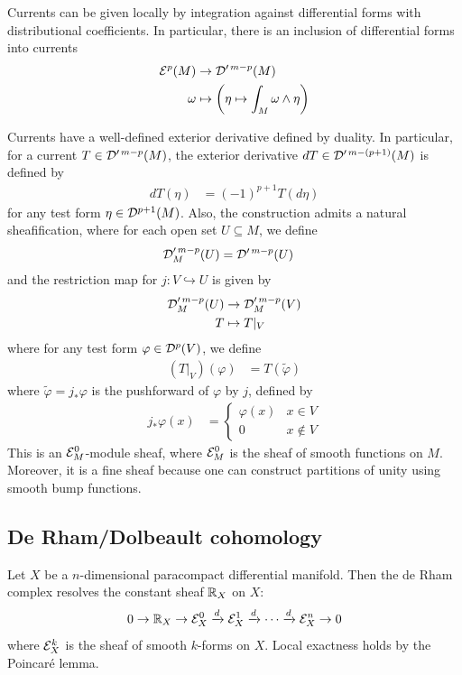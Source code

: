 \documentclass[12pt]{article}
\begin{document}
Currents can be given locally by integration against differential forms with distributional coefficients. In particular, there is an inclusion of differential forms into currents \begin{align*}
    {\mathcal{E}}^p(M) & \to {\mathcal{D}}'^{\,m-p}(M) \\
    \omega & \mapsto \left( \eta \mapsto \int_M \omega \wedge \eta \right)
\end{align*} 

Currents have a well-defined exterior derivative defined by duality. In particular, for a current $T \in {\mathcal{D}}'^{\,m-p}(M)$, the exterior derivative $dT \in {\mathcal{D}}'^{\,m-(p+1)}(M)$ is defined by \begin{align*}
    dT(\eta) & = (-1)^{p+1} T(d\eta)
\end{align*} for any test form $\eta \in {\mathcal{D}}^{p+1}(M)$. Also, the construction admits a natural sheafification, where for each open set $U \subseteq M$, we define \begin{align*}
    {\mathcal{D}}'^{\,m-p}_M(U) & = {\mathcal{D}}'^{\,m-p}(U)
\end{align*} and the restriction map for $j: V \hookrightarrow U$ is given by \begin{align*}
    {\mathcal{D}}'^{\,m-p}_M(U) & \to {\mathcal{D}}'^{\,m-p}_M(V) \\
    T & \mapsto T|_V
\end{align*} where for any test form $\varphi \in {\mathcal{D}}^p(V)$, we define \begin{align*}
    (T|_V)(\varphi) & = T(\tilde{\varphi})
\end{align*} where $\tilde {\varphi} = j_* \varphi$ is the pushforward of $\varphi$ by $j$, defined by \begin{align*}
    j_* \varphi(x) & = \begin{cases}
        \varphi(x) & x \in V \\
        0 & x \notin V
    \end{cases}
\end{align*} 
This is an ${\mathcal{E}}^0_M$-module sheaf, where ${\mathcal{E}}^0_M$ is the sheaf of smooth functions on $M$. Moreover, it is a fine sheaf because one can construct partitions of unity using smooth bump functions.

\subsection{De Rham/Dolbeault cohomology}
Let $X$ be a $n$-dimensional paracompact
differential manifold. Then the de Rham complex resolves the constant sheaf $\mathbb{R}_X$ on $X$:
\[0 \to \mathbb{R}_X \to {\mathcal{E}}^0_X \xrightarrow{d} {\mathcal{E}}^1_X \xrightarrow{d} \cdots \xrightarrow{d} {\mathcal{E}}^n_X \to 0\]
where ${\mathcal{E}}^k_X$ is the sheaf of smooth $k$-forms on $X$. Local exactness holds by the Poincaré lemma.
\end{document}
